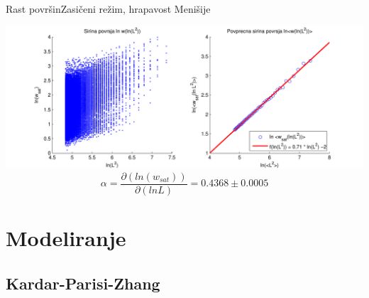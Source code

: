 \documentclass{beamer}
\begin{document}
\begin{frame}{Rast površin}{Zasičeni režim, hrapavost Menišije}
\begin{center}
  \footnotesize
  \hspace*{-0.04\textwidth}\includegraphics[width=1.1\textwidth]{slike/menisija-alfa-3d}
  \begin{equation} \alpha = \frac{\partial ( ln (w_{sat}) ) }{\partial ( ln L )} =  0.4368 \pm 0.0005 \end{equation}
\end{center}
\end{frame}


\section{Modeliranje}

\subsection{Kardar-Parisi-Zhang}
\end{document}
